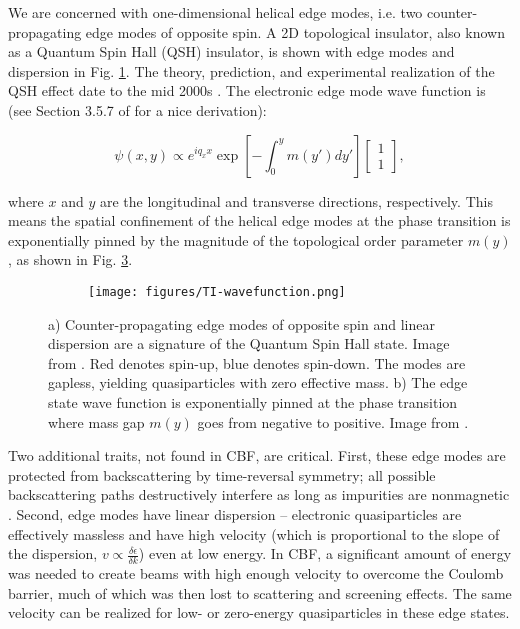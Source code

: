 \documentclass[onecolumn,
               superscriptaddress,
               floatfix,
               longbibliography, 
               showkeys,apl]{revtex4-2}
\begin{document}
\begin{appendices}
We are concerned with one-dimensional helical edge modes, i.e. two counter-propagating edge modes of opposite spin. A 2D topological insulator, also known as a Quantum Spin Hall (QSH) insulator, is shown with edge modes and dispersion in Fig. \ref{subfig:QSH}. The theory, prediction, and experimental realization of the QSH effect date to the mid 2000s \cite{PhysRevLett.95.146802,PhysRevLett.95.226801,doi:10.1126/science.1133734,doi:10.1126/science.1148047}. The electronic edge mode wave function is (see Section 3.5.7 of \cite{FRUCHART2013779} for a nice derivation):

\begin{equation}
    \psi (x,y) \propto e^{iq_xx} \exp \left[-\int_{0}^{y} m(y') dy'\right] \begin{bmatrix}1 \\ 1\end{bmatrix},
\label{eq:tiwavefunction}
\end{equation}

where $x$ and $y$ are the longitudinal and transverse directions, respectively. This means the spatial confinement of the helical edge modes at the phase transition is exponentially pinned by the magnitude of the topological order parameter $m(y)$, as shown in Fig. \ref{subfig:TI-wavefunction}.

\begin{figure}[H]
\begin{subfigure}{.5\textwidth}
    \centering
    \caption{}    
    \label{subfig:QSH}
\end{subfigure}
\begin{subfigure}{.5\textwidth}
    \centering
    \texttt{[image: figures/TI-wavefunction.png]}
    \caption{}
    \label{subfig:TI-wavefunction}
\end{subfigure}
\caption{a) Counter-propagating edge modes of opposite spin and linear dispersion are a signature of the Quantum Spin Hall state. Image from \cite{RevModPhys.83.1057}. Red denotes spin-up, blue denotes spin-down. The modes are gapless, yielding quasiparticles with zero effective mass. b) The edge state wave function is exponentially pinned at the phase transition where mass gap $m(y)$ goes from negative to positive. Image from \cite{FRUCHART2013779}.}
\end{figure}

Two additional traits, not found in CBF, are critical. First, these edge modes are protected from backscattering by time-reversal symmetry; all possible backscattering paths destructively interfere as long as impurities are nonmagnetic \cite{RevModPhys.83.1057}. Second, edge modes have linear dispersion -- electronic quasiparticles are effectively massless and have high velocity (which is proportional to the slope of the dispersion, $v \propto \frac{\delta\epsilon}{\delta k}$) even at low energy. In CBF, a significant amount of energy was needed to create beams with high enough velocity to overcome the Coulomb barrier, much of which was then lost to scattering and screening effects. The same velocity can be realized for low- or zero-energy quasiparticles in these edge states.



\end{appendices}
\end{document}
